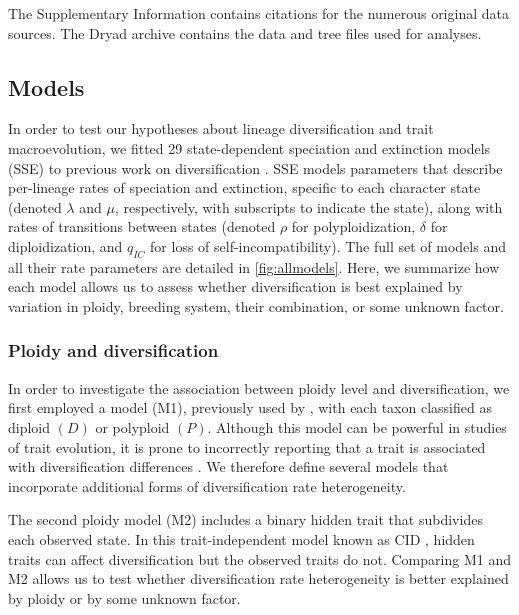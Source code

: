 The Supplementary Information contains citations for the numerous original data sources. %
The Dryad archive contains the data and tree files used for analyses. %

\subsection{Models}

In order to test our hypotheses about lineage diversification and trait macroevolution, we fitted 29 state-dependent speciation and extinction models (SSE) to previous work on diversification \citep[BiSSE, MuSSE, HiSSE;][]{maddison_2007, fitzjohn_2012, beaulieu_2016}.
SSE models parameters that describe per-lineage rates of speciation and extinction, specific to each character state (denoted $\lambda$ and $\mu$, respectively, with subscripts to indicate the state), along with rates of transitions between states (denoted $\rho$ for polyploidization, $\delta$ for diploidization, and $q_{IC}$ for loss of self-incompatibility).
The full set of models and all their rate parameters are detailed in \cref{fig:allmodels}.
Here, we summarize how each model allows us to assess whether diversification is best explained by variation in ploidy, breeding system, their combination, or some unknown factor.

\subsubsection{Ploidy and diversification}

In order to investigate the association between ploidy level and diversification, we first employed a model  (M1), previously used by \citet{mayrose_2011}, with each taxon classified as diploid $(D)$ or polyploid $(P)$.
Although this model can be powerful in studies of trait evolution, it is prone to incorrectly reporting that a trait is associated with diversification differences \citep{maddison_2015, rabosky_2015}.
We therefore define several models that incorporate additional forms of diversification rate heterogeneity.

The second ploidy model (M2) includes a binary hidden trait that subdivides each observed state.
In this trait-independent model known as CID \citep{beaulieu_2016}, hidden traits can affect diversification but the observed traits do not.
Comparing M1 and M2 allows us to test whether diversification rate heterogeneity is better explained by ploidy or by some unknown factor.

